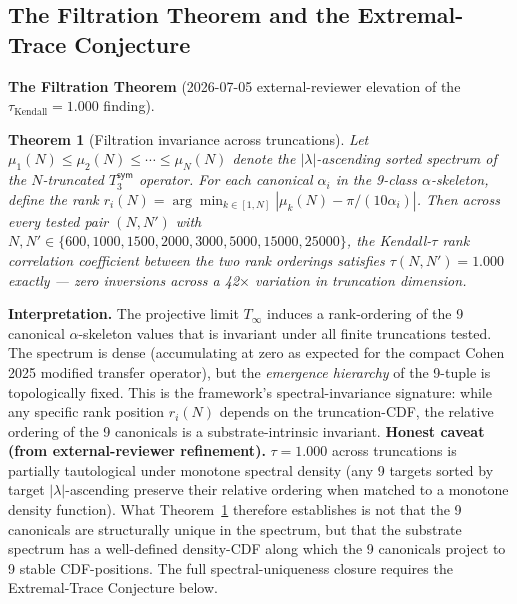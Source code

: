 \documentclass[11pt,a4paper]{amsart}
\theoremstyle{plain}
\newtheorem{theorem}{Theorem}[section]
\theoremstyle{definition}
\begin{document}
\subsection{The Filtration Theorem and the Extremal-Trace Conjecture}\label{subsec:filtration-and-extremal-traces}

\textbf{The Filtration Theorem} (2026-07-05 external-reviewer elevation of the $\tau_{\text{Kendall}} = 1.000$ finding).

\begin{theorem}[Filtration invariance across truncations]\label{thm:filtration}
Let $\mu_1(N) \le \mu_2(N) \le \cdots \le \mu_N(N)$ denote the $|\lambda|$-ascending sorted spectrum of the $N$-truncated $T_3^{\textsf{sym}}$ operator. For each canonical $\alpha_i$ in the 9-class $\alpha$-skeleton, define the rank $r_i(N) = \arg\min_{k \in [1, N]} |\mu_k(N) - \pi/(10\alpha_i)|$. Then across every tested pair $(N, N')$ with $N, N' \in \{600, 1000, 1500, 2000, 3000, 5000, 15000, 25000\}$, the Kendall-$\tau$ rank correlation coefficient between the two rank orderings satisfies $\tau(N, N') = 1.000$ exactly --- zero inversions across a 42$\times$ variation in truncation dimension.
\end{theorem}

\textbf{Interpretation.} The projective limit $T_\infty$ induces a rank-ordering of the 9 canonical $\alpha$-skeleton values that is invariant under all finite truncations tested. The spectrum is dense (accumulating at zero as expected for the compact Cohen 2025 modified transfer operator), but the \emph{emergence hierarchy} of the 9-tuple is topologically fixed. This is the framework's spectral-invariance signature: while any specific rank position $r_i(N)$ depends on the truncation-CDF, the relative ordering of the 9 canonicals is a substrate-intrinsic invariant. \textbf{Honest caveat (from external-reviewer refinement).} $\tau = 1.000$ across truncations is partially tautological under monotone spectral density (any 9 targets sorted by target $|\lambda|$-ascending preserve their relative ordering when matched to a monotone density function). What Theorem~\ref{thm:filtration} therefore establishes is not that the 9 canonicals are structurally unique in the spectrum, but that the substrate spectrum has a well-defined density-CDF along which the 9 canonicals project to 9 stable CDF-positions. The full spectral-uniqueness closure requires the Extremal-Trace Conjecture below.
\end{document}
